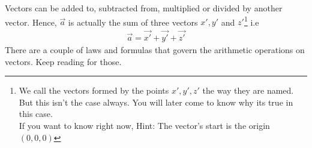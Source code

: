 \begin{phybox}{}
{\begin{center}
\end{center}
Vectors can be added to, subtracted from, multiplied or divided by another vector. Hence, $\Vec{a}$ is actually the sum of three vectors $x', y'$ and $z'$\footnote{We call the vectors formed by the points $x', y', z'$ the way they are named. But this isn't the case always. You will later come to know why its true in this case.\\
If you want to know right now, Hint: The vector's start is the origin $(0,0,0)$ } i.e
\begin{align*}
    \Vec{a} = \Vec{x'} + \Vec{y'} + \Vec{z'}
\end{align*}
There are a couple of laws and formulas that govern the arithmetic operations on vectors. Keep reading for those.}
\end{phybox}
